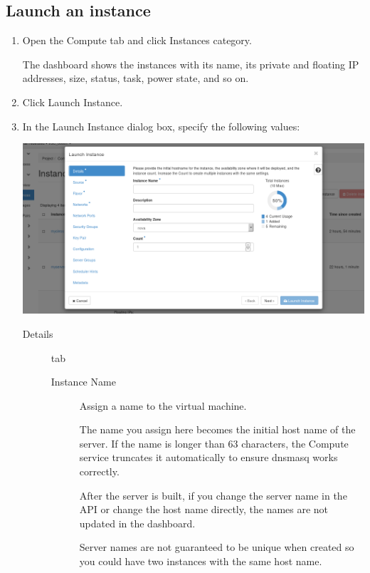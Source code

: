 \subsection*{Launch an instance}\label{launch-an-instance}
\begin{enumerate}
\item Open the Compute tab and click Instances category.

  The dashboard shows the instances with its name, its private and
  floating IP addresses, size, status, task, power state, and so on.
\item Click Launch Instance.
\item In the Launch Instance dialog box, specify the following values:

  \begin{center}
    \includegraphics[scale=0.5]{img/tab-compute-instances-launch.png}
  \end{center}
  
  \begin{description}
  \item[Details] tab
    \begin{description}
    \item[Instance Name] Assign a name to the virtual machine.

       The name you assign here becomes the initial host
      name of the server. If the name is longer than 63 characters,
      the Compute service truncates it automatically to ensure dnsmasq
      works correctly.

      After the server is built, if you change the server name in the
      API or change the host name directly, the names are not updated
      in the dashboard.

      Server names are not guaranteed to be unique when created so you
      could have two instances with the same host name.


\end{description}
\end{description}
\end{enumerate}
